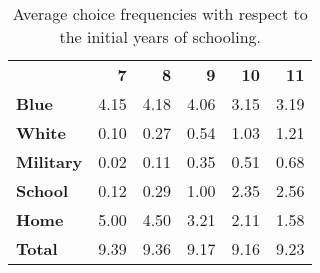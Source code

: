 \begin{ThreePartTable}

	\begin{longtable}[c]{@{}lrrrrr@{}}
		\caption{Average choice frequencies with respect to the initial years of schooling.}
		\label{tab:InitialSchoolingActivity}

		\setlength\extrarowheight{2.5pt}
		
		\\
		\toprule
		
   &	\textbf{7}	&	\textbf{8}	&	\textbf{9}	&	\textbf{10}	&	\textbf{11}	\\ \midrule
		\endfirsthead
\textbf{Blue}	&	4.15	&	4.18	&	4.06	&	3.15	&	3.19	\\
\textbf{White}	&	0.10	&	0.27	&	0.54	&	1.03	&	1.21	\\
\textbf{Military}&	0.02	&	0.11	&	0.35	&	0.51	&	0.68	\\
\textbf{School}	&	0.12	&	0.29	&	1.00	&	2.35	&	2.56	\\
\textbf{Home}	&	5.00	&	4.50	&	3.21	&	2.11	&	1.58	\\
\textbf{Total}	&	9.39	&	9.36	&	9.17	&	9.16	&	9.23	\\



  \bottomrule
	\end{longtable}
\end{ThreePartTable}